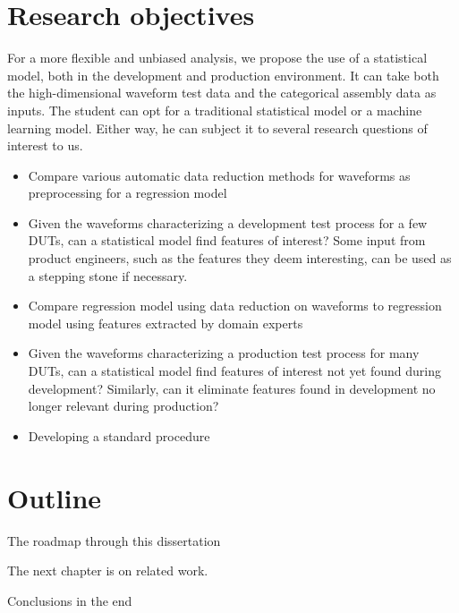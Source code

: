 \section{Research objectives}

For a more flexible and unbiased analysis, we propose the use of a statistical model, both in the development
and production environment. It can take both the high-dimensional waveform test data and the categorical
assembly data as inputs. The student can opt for a traditional statistical model or a machine learning model.
Either way, he can subject it to several research questions of interest to us.

\begin{itemize}
      \item Compare various automatic data reduction methods for waveforms as
            preprocessing for a regression model
      \item Given the waveforms characterizing a development test process for a few DUTs, can a statistical
            model find features of interest? Some input from product engineers, such as the features they deem
            interesting, can be used as a stepping stone if necessary.
      \item Compare regression model using data reduction on waveforms to
            regression model using features extracted by domain experts
      \item Given the waveforms characterizing a production test process for many DUTs, can a statistical model
            find features of interest not yet found during development? Similarly, can it eliminate features found
            in development no longer relevant during production?
      \item Developing a standard procedure
\end{itemize}

\section{Outline}

The roadmap through this dissertation

The next chapter is on related work.

Conclusions in the end